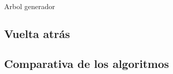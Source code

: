 \begin{frame}{Arbol generador}
\end{frame}

\subsection{Vuelta atrás}


\subsection{Comparativa de los algoritmos}

